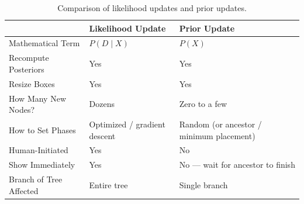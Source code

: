 \begin{table}[h]
\centering
\begin{tabular}{lll}
\hline
\textbf{} & \textbf{Likelihood Update} & \textbf{Prior Update} \\
\hline
Mathematical Term       & $P(D \mid X)$                         & $P(X)$ \\
Recompute Posteriors    & Yes                                   & Yes \\
Resize Boxes            & Yes                                   & Yes \\
How Many New Nodes?     & Dozens                                & Zero to a few \\
How to Set Phases       & Optimized / gradient descent          & Random (or ancestor / minimum placement) \\
Human-Initiated         & Yes                                   & No \\
Show Immediately        & Yes                                   & No --- wait for ancestor to finish \\
Branch of Tree Affected & Entire tree                           & Single branch \\
\hline
\end{tabular}
\caption{Comparison of likelihood updates and prior updates.}
\label{tab:updates}
\end{table}